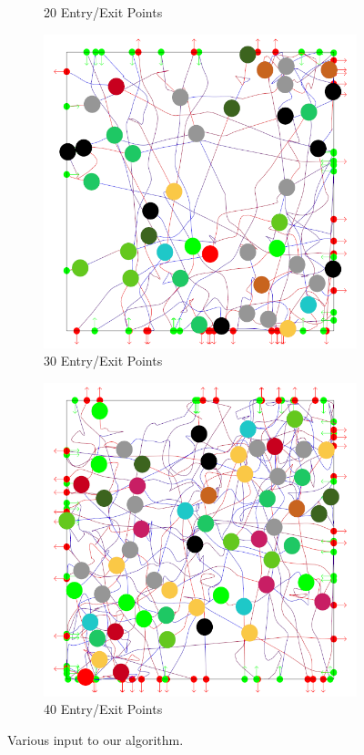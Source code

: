 \begin{figure}[t]
\begin{subfigure}[b]{0.24\linewidth}
	\caption{20 Entry/Exit Points}
 \end{subfigure}
%
 \begin{subfigure}[b]{0.24\linewidth}
	\includegraphics[width=\linewidth]{images/res-30-entry-exit.png}
	\caption{30 Entry/Exit Points}
 \end{subfigure}
%
 \begin{subfigure}[b]{0.24\linewidth}
	\includegraphics[width=\linewidth]{images/res-40-entry-exit.png}
	\caption{40 Entry/Exit Points}
 \end{subfigure}
%
\caption{Various input to our algorithm.}
\label{fig:res:inputs}
\end{figure}





